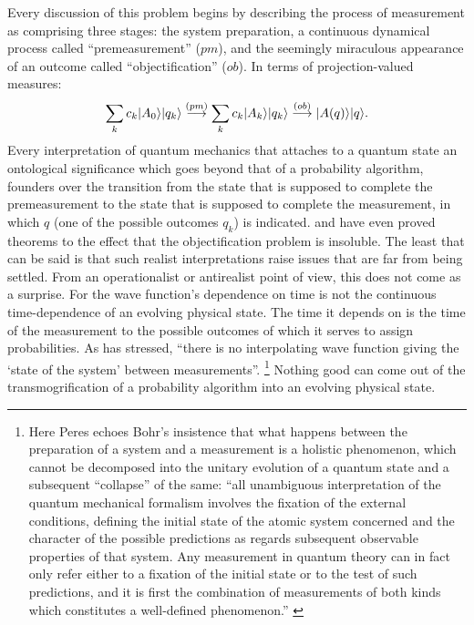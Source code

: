 Every discussion of this problem begins by describing the process of measurement as comprising three stages: the system preparation, a continuous dynamical process called ``premeasurement''  ($pm$), and the seemingly miraculous appearance of an outcome called ``objectification'' ($ob$). In terms of projection-valued measures:
\begin{equation}
\sum_{k}c_k|A_0\rangle|q_k\rangle\stackrel{(pm)}{\longrightarrow}
\sum_{k}c_k|A_k\rangle|q_k\rangle\stackrel{(ob)}{\longrightarrow}
|A(q)\rangle|q\rangle.
\label{eq_pmob}
\end{equation}
Every interpretation of quantum mechanics that attaches to a quantum state an ontological significance which goes beyond that of a probability algorithm, founders over the transition from the state that is supposed to complete the premeasurement to the state that is supposed to complete the measurement, in which $q$ (one of the possible outcomes $q_k$) is indicated. \citet[Sect.~4.3b]{Mittelstaedt} and \citet[Sect.~III.6.2]{Buschetal} have even proved theorems to the effect that the objectification problem is insoluble. The least that can be said is that such realist interpretations raise issues that are far from being settled. From an operationalist or antirealist point of view, this does not come as a surprise.  For the wave function's dependence on time is not the continuous time-dependence of an evolving physical state. The time it depends on is the time of the measurement to the possible outcomes of which it serves to assign probabilities. As \citet{Peres84} has stressed, ``there is no interpolating wave function giving the `state of the system' between measurements''.%
\footnote{Here Peres echoes Bohr's insistence that what happens between the preparation of a system and a measurement is a holistic phenomenon, which cannot be decomposed into the unitary evolution of a quantum state and a subsequent ``collapse'' of the same: ``all unambiguous interpretation of the quantum mechanical formalism involves the fixation of the external conditions, defining the initial state of the atomic system concerned and the character of the possible predictions as regards subsequent observable properties of that system. Any measurement in quantum theory can in fact only refer either to a fixation of the initial state or to the test of such predictions, and it is first the combination of measurements of both kinds which constitutes a well-defined phenomenon.'' \citep{Bohr1939}}
Nothing good can come out of the transmogrification of a probability algorithm into an evolving physical state. 

